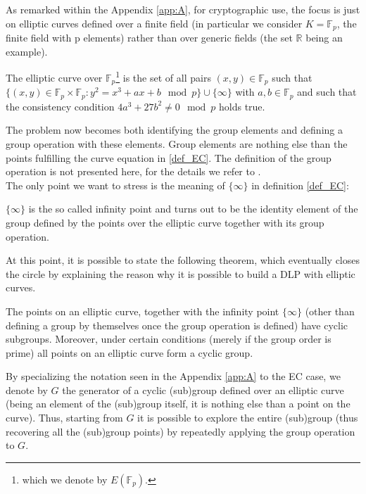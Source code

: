 As remarked within the Appendix \ref{app:A}, for cryptographic use, the focus is just on elliptic curves defined over a finite field (in particular we consider $K = \mathbb{F}_p$, the finite field with p elements) rather than over generic fields (the set $\mathbb{R}$ being an example).
\begin{mydef}
\label{def_EC}
    The elliptic curve over $\mathbb{F}_p$\footnote{which we denote by $E(\mathbb{F}_p)$.} is the set of all pairs $(x,y) \in \mathbb{F}_p$ such that $\{(x,y) \in \mathbb{F}_p \times \mathbb{F}_p: y^2 = x^3 + ax+b \mod p\} \cup \{\infty\}$ with $a,b \in \mathbb{F}_p$ and such that the consistency condition $4 a^3+27b^2 \neq 0 \mod{p}$ holds true.
\end{mydef}
\noindent
The problem now becomes both identifying the group elements and defining a group operation with these elements. Group elements are nothing else than the points fulfilling the curve equation in \ref{def_EC}. The definition of the group operation is not presented here, for the details we refer to \cite{UnderstandingCrypto}.\\
The only point we want to stress is the meaning of $\{\infty \}$ in definition \ref{def_EC}:
\begin{myrem}
    $\{\infty \}$ is the so called infinity point and turns out to be the identity element of the group defined by the points over the elliptic curve together with its group operation.
\end{myrem}
\noindent
At this point, it is possible to state the following theorem, which eventually closes the circle by explaining the reason why it is possible to build a DLP with elliptic curves.
\begin{mytheorem}
    The points on an elliptic curve, together with the infinity point $\{\infty \}$ (other than defining a group by themselves once the group operation is defined) have cyclic subgroups. Moreover, under certain conditions (merely if the group order is prime) all points on an elliptic curve form a cyclic group.
\end{mytheorem}
\begin{myrem}
    By specializing the notation seen in the Appendix \ref{app:A} to the EC case, we denote by $G$ the generator of a cyclic (sub)group defined over an elliptic curve (being an element of the (sub)group itself, it is nothing else than a point on the curve). Thus, starting from $G$ it is possible to explore the entire (sub)group (thus recovering all the (sub)group points) by repeatedly applying the group operation to $G$.
\end{myrem}
